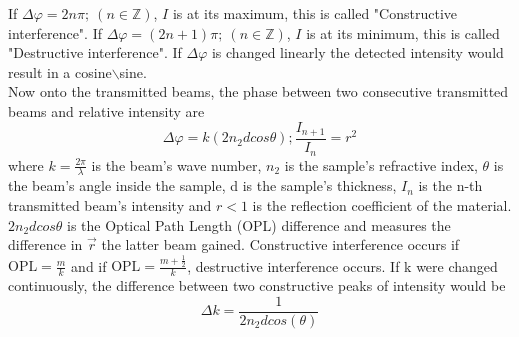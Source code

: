 \documentclass[reprint,amsmath,amssymb,aps, prl,superscriptaddress]{revtex4-2}
\begin{document}
If $\Delta\varphi=2n\pi;\ (n\in\mathbb{Z})$, $I$ is at its maximum, this is called "Constructive interference". If $\Delta\varphi=(2n+1)\pi;\ (n\in\mathbb{Z})$, $I$ is at its minimum, this is called "Destructive interference". If $\Delta\varphi$ is changed linearly the detected intensity would result in a cosine$\backslash$sine\cite{FundamentalsOfPhotonics}.\\
Now onto the transmitted beams, the phase between two consecutive transmitted beams and relative intensity are
\begin{equation} \label{eq:ThinPhaseAmp}
\Delta\varphi=k(2n_{2}dcos\theta);\frac{I_{n+1}}{I_{n}}=r^{2}
\end{equation}
where $k=\frac{2\pi}{\lambda}$ is the beam's wave number, $n_{2}$ is the sample's refractive index, $\theta$ is the beam's angle inside the sample,  d is the sample's thickness, $I_{n}$ is the n-th transmitted beam's intensity and $r<1$ is the reflection coefficient of the material. $2n_{2}dcos\theta$ is the Optical Path Length (OPL) difference and measures the difference in $\vec{r}$ the latter beam gained. Constructive interference occurs if $\text{OPL}=\frac{m}{k}$ and if $\text{OPL}=\frac{m+\frac{1}{2}}{k}$, destructive interference occurs. If k were changed continuously, the difference between two constructive peaks of intensity would be
\begin{equation} \label{eq:ThinDiffWavenum}
\Delta k=\frac{1}{2n_{2}dcos(\theta)}
\end{equation}

\end{document}
